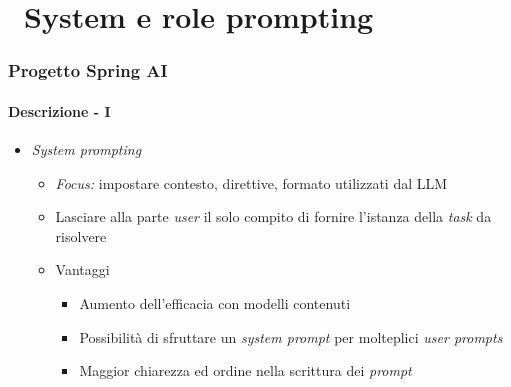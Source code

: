 \section{\faWrench\ System e role prompting} %
\label{sec:spring-ai-gemini-system-role-prompting}
%
\begin{frame}[t,fragile] \frametitle{Progetto Spring AI}
    \framesubtitle{Descrizione - I}
    {\small
        \begin{itemize}[leftmargin=10pt,align=right]
            \item[\alertedcircled{1}] \textit{System prompting}
            \begin{itemize}[leftmargin=10pt,align=right]
                \item[\alert{\faArrowCircleRight}] \textit{Focus:} impostare contesto, direttive, formato utilizzati dal LLM
                \item[\alert{\faExclamationTriangle}] Lasciare alla parte \textit{user} il solo compito di fornire l'istanza della \textit{task} da risolvere
                \item[\alert{\faArrowCircleRight}] Vantaggi
                \begin{itemize}[leftmargin=10pt,align=right]
                    \item[\alert{\faArrowCircleRight}] Aumento dell'efficacia con modelli contenuti
                    \item[\alert{\faArrowCircleRight}] Possibilità di sfruttare un \textit{system prompt} per molteplici \textit{user prompts}
                    \item[\alert{\faArrowCircleRight}] Maggior chiarezza ed ordine nella scrittura dei \textit{prompt}
                \end{itemize}              
            \end{itemize}
        \end{itemize}
    }
\end{frame}
%
